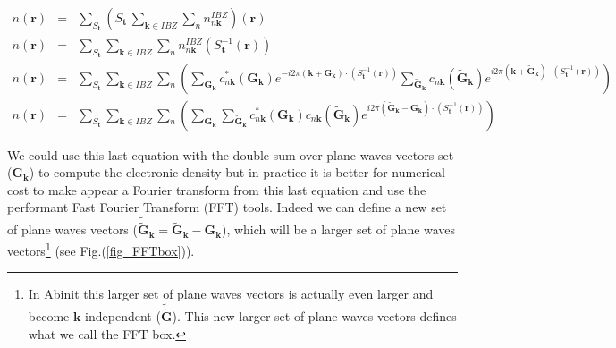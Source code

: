 \documentclass[a4paper,12pt]{report}
\begin{document}
\begin{eqnarray}
n(\mathbf{r}) &=& \sum_{S_{\mathbf{t}}} \left( S_{\mathbf{t}}\, \sum_{\mathbf{k} \in IBZ} \sum_n n^{IBZ}_{n\mathbf{k}} \right) (\mathbf{r}) \label{eqnIBZr2}\\
n(\mathbf{r}) &=& \sum_{S_{\mathbf{t}}} \sum_{\mathbf{k} \in IBZ} \sum_n n^{IBZ}_{n\mathbf{k}} (S_{\mathbf{t}}^{-1} (\mathbf{r})) \nonumber\\
n(\mathbf{r}) &=& \sum_{S_{\mathbf{t}}} \sum_{\mathbf{k} \in IBZ} \sum_n \left( \sum_{\mathbf{G}_{\mathbf{k}}} c_{n\mathbf{k}}^{*}(\mathbf{G}_{\mathbf{k}}) e^{-i2\pi \left( \mathbf{k} + \mathbf{G}_{\mathbf{k}}\right)\cdotp \left( S_{\mathbf{t}}^{-1} (\mathbf{r})\right) } \sum_{\tilde{\mathbf{G}}_{\mathbf{k}}} c_{n\mathbf{k}}(\tilde{\mathbf{G}}_{\mathbf{k}}) e^{i2\pi \left( \mathbf{k} + \tilde{\mathbf{G}}_{\mathbf{k}}\right)\cdotp \left( S_{\mathbf{t}}^{-1} (\mathbf{r})\right) } \right) \nonumber\\
n(\mathbf{r}) &=& \sum_{S_{\mathbf{t}}} \sum_{\mathbf{k} \in IBZ} \sum_n \left( \sum_{\mathbf{G}_{\mathbf{k}}} \sum_{\tilde{\mathbf{G}}_{\mathbf{k}}} c_{n\mathbf{k}}^{*}(\mathbf{G}_{\mathbf{k}}) c_{n\mathbf{k}}(\tilde{\mathbf{G}}_{\mathbf{k}}) e^{i2\pi \left( \tilde{\mathbf{G}}_{\mathbf{k}} -\mathbf{G}_{\mathbf{k}} \right)\cdotp \left( S_{\mathbf{t}}^{-1} (\mathbf{r})\right) } \right)
\end{eqnarray}

We could use this last equation with the double sum over plane waves vectors set ($\mathbf{G}_{\mathbf{k}}$) to compute the electronic density but in practice it is better for numerical cost to make appear a Fourier transform from this last equation and use the performant Fast Fourier Transform (FFT) tools. Indeed we can define a new set of plane waves vectors ($\tilde{\tilde{\mathbf{G}}}_{\mathbf{k}} = \tilde{\mathbf{G}}_{\mathbf{k}} -\mathbf{G}_{\mathbf{k}}$), which will be a larger set of plane waves vectors\footnote{ In Abinit this larger set of plane waves vectors is actually even larger and become $\mathbf{k}$-independent ($\tilde{\tilde{\mathbf{G}}}$). This new larger set of plane waves vectors defines what we call the FFT box.} (see Fig.(\ref{fig_FFTbox})).\\
\end{document}
